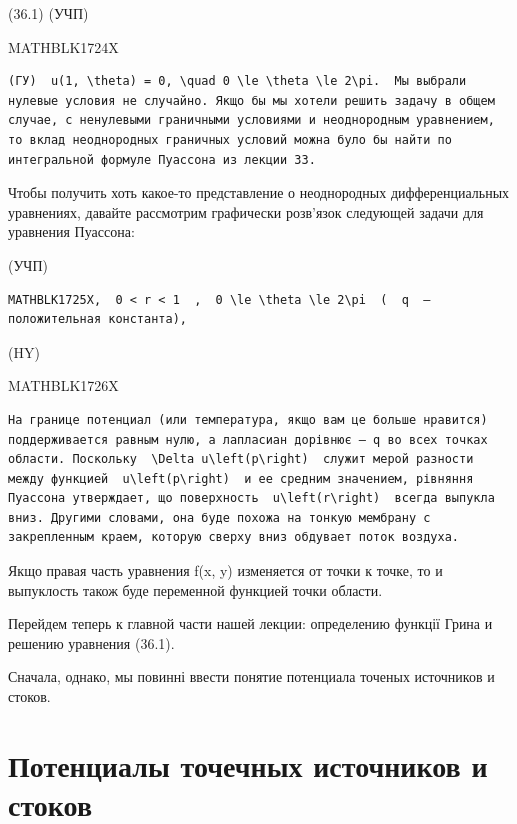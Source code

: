 \documentclass[
  ukrainian,
]{article}
\begin{document}
(36.1) (УЧП)

MATHBLK1724X

\begin{verbatim}
(ГУ)  u(1, \theta) = 0, \quad 0 \le \theta \le 2\pi.  Мы выбрали нулевые условия не случайно. Якщо бы мы хотели решить задачу в общем случае, с ненулевыми граничными условиями и неоднородным уравнением, то вклад неоднородных граничных условий можна було бы найти по интегральной формуле Пуассона из лекции 33.
\end{verbatim}

Чтобы получить хоть какое-то представление о неоднородных
дифференциальных уравнениях, давайте рассмотрим графически розв'язок
следующей задачи для уравнения Пуассона:

(УЧП)

\begin{verbatim}
MATHBLK1725X,  0 < r < 1  ,  0 \le \theta \le 2\pi  (  q  —положительная константа),
\end{verbatim}

(HY)

MATHBLK1726X

\begin{verbatim}
На границе потенциал (или температура, якщо вам це больше нравится) поддерживается равным нулю, а лапласиан дорівнює — q во всех точках области. Поскольку  \Delta u\left(p\right)  служит мерой разности между функцией  u\left(p\right)  и ее средним значением, рівняння Пуассона утверждает, що поверхность  u\left(r\right)  всегда выпукла вниз. Другими словами, она буде похожа на тонкую мембрану с закрепленным краем, которую сверху вниз обдувает поток воздуха.
\end{verbatim}

Якщо правая часть уравнения f(x, y) изменяется от точки к точке, то и
выпуклость також буде переменной функцией точки области.

Перейдем теперь к главной части нашей лекции: определению функції Грина
и решению уравнения (36.1).

Сначала, однако, мы повинні ввести понятие потенциала точеных источников
и стоков.

\section{Потенциалы точечных источников и
стоков}\label{ux43fux43eux442ux435ux43dux446ux438ux430ux43bux44b-ux442ux43eux447ux435ux447ux43dux44bux445-ux438ux441ux442ux43eux447ux43dux438ux43aux43eux432-ux438-ux441ux442ux43eux43aux43eux432}
\end{document}
